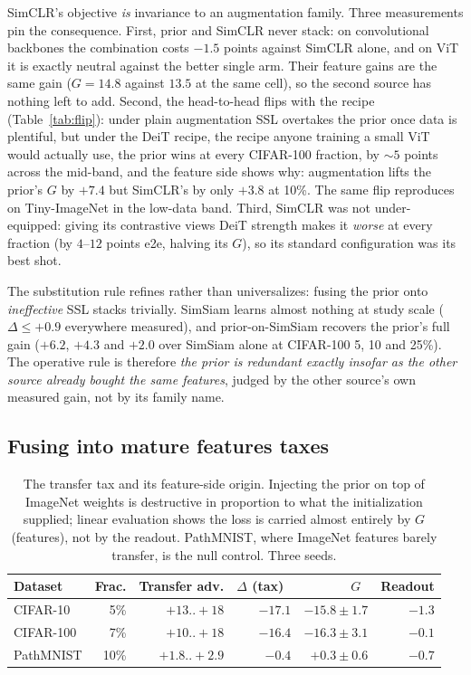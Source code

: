 SimCLR's objective \emph{is} invariance to an augmentation family. Three
measurements pin the consequence. First, prior and SimCLR never stack:
on convolutional backbones the combination costs $-1.5$ points against
SimCLR alone, and on ViT it is exactly neutral against the better single arm. Their
feature gains are the same gain ($G = 14.8$ against $13.5$ at the same cell),
so the second source has nothing left to add. Second, the
head-to-head flips with the recipe (Table~\ref{tab:flip}): under plain
augmentation SSL overtakes the prior once data is plentiful, but under
the DeiT recipe, the recipe anyone training a small ViT would actually
use, the prior wins at every CIFAR-100 fraction, by ${\sim}5$ points
across the mid-band, and the feature side shows why: augmentation lifts the
prior's $G$ by $+7.4$ but SimCLR's by only $+3.8$ at 10\%. The same flip
reproduces on Tiny-ImageNet in the low-data band. Third, SimCLR was not
under-equipped: giving its contrastive views DeiT strength makes it
\emph{worse} at every fraction (by $4$--$12$ points e2e, halving its
$G$), so its standard configuration was its best shot.

The substitution rule refines rather than universalizes: fusing the prior
onto \emph{ineffective} SSL stacks trivially. SimSiam learns almost
nothing at study scale ($\Delta \leq +0.9$ everywhere measured), and
prior-on-SimSiam recovers the prior's full gain ($+6.2$, $+4.3$ and
$+2.0$ over SimSiam alone at CIFAR-100 5, 10 and 25\%). The operative rule is therefore
\emph{the prior is redundant exactly insofar as the other source already
bought the same features}, judged by the other source's own measured
gain, not by its family name.

\subsection{Fusing into mature features taxes}\label{sec:taxsub}
\begin{table}[pos=htbp]
\caption{The transfer tax and its feature-side origin. Injecting the
prior on top of ImageNet weights is destructive in proportion to what the
initialization supplied; linear evaluation shows the loss is carried almost
entirely by $G$ (features), not by the readout. PathMNIST, where
ImageNet features barely transfer, is the null control. Three seeds.}
\label{tab:tax}
\centering\scriptsize
\setlength{\tabcolsep}{2.6pt}
\begin{tabular}{lrrrrr}
\toprule
Dataset & Frac. & Transfer adv. & $\Delta$ (tax)~\up & $G$~\up & Readout \\
\midrule
CIFAR-10 & 5\% & $+13..{+}18$ & $-17.1$ & $-15.8 \pm 1.7$ & $-1.3$ \\
CIFAR-100 & 7\% & $+10..{+}18$ & $-16.4$ & $-16.3 \pm 3.1$ & $-0.1$ \\
PathMNIST & 10\% & $+1.8..{+}2.9$ & $-0.4$ & $+0.3 \pm 0.6$ & $-0.7$ \\
\bottomrule
\end{tabular}
\end{table}

